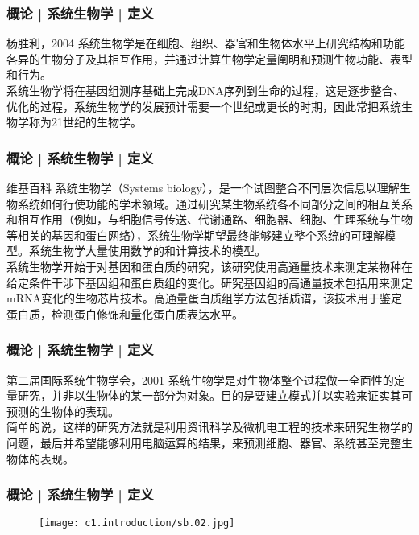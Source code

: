 \begin{frame}
  \frametitle{概论 | 系统生物学 | 定义}
  \begin{block}{杨胜利，2004}
系统生物学是在细胞、组织、器官和生物体水平上研究结构和功能各异的生物分子及其相互作用，并通过计算生物学定量阐明和预测生物功能、表型和行为。\\
\vspace{1em}
系统生物学将在基因组测序基础上完成DNA序列到生命的过程，这是逐步整合、优化的过程，系统生物学的发展预计需要一个世纪或更长的时期，因此常把系统生物学称为21世纪的生物学。
  \end{block}
\end{frame}

\begin{frame}
  \frametitle{概论 | 系统生物学 | 定义}
  \begin{block}{维基百科}
系统生物学（Systems biology），是一个试图整合不同层次信息以理解生物系统如何行使功能的学术领域。通过研究某生物系统各不同部分之间的相互关系和相互作用（例如，与细胞信号传送、代谢通路、细胞器、细胞、生理系统与生物等相关的基因和蛋白网络），系统生物学期望最终能够建立整个系统的可理解模型。系统生物学大量使用数学的和计算技术的模型。\\
\vspace{1em}
系统生物学开始于对基因和蛋白质的研究，该研究使用高通量技术来测定某物种在给定条件干涉下基因组和蛋白质组的变化。研究基因组的高通量技术包括用来测定mRNA变化的生物芯片技术。高通量蛋白质组学方法包括质谱，该技术用于鉴定蛋白质，检测蛋白修饰和量化蛋白质表达水平。
  \end{block}
\end{frame}

\begin{frame}
  \frametitle{概论 | 系统生物学 | 定义}
  \begin{block}{第二届国际系统生物学会，2001}
系统生物学是对生物体整个过程做一全面性的定量研究，并非以生物体的某一部分为对象。目的是要建立模式并以实验来证实其可预测的生物体的表现。\\
\vspace{1em}
简单的说，这样的研究方法就是利用资讯科学及微机电工程的技术来研究生物学的问题，最后并希望能够利用电脑运算的结果，来预测细胞、器官、系统甚至完整生物体的表现。
  \end{block}
\end{frame}

\begin{frame}
  \frametitle{概论 | 系统生物学 | 定义}
  \begin{figure}
    \centering
    \texttt{[image: c1.introduction/sb.02.jpg]}
  \end{figure}
\end{frame}

